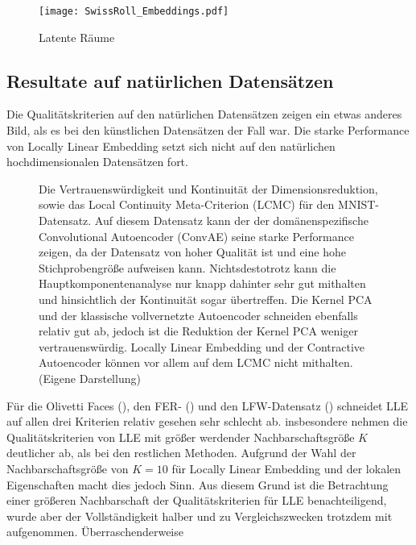 \begin{figure}[ht]
	\centering
	\texttt{[image: SwissRoll\_Embeddings.pdf]}
	\caption{Latente Räume}
\end{figure}

\subsection{Resultate auf natürlichen Datensätzen}
\label{ch:Vergleich:sec:Resultate:natuerlich}

Die Qualitätskriterien auf den natürlichen Datensätzen zeigen ein etwas anderes Bild, als es bei
den künstlichen Datensätzen der Fall war. Die starke Performance von Locally Linear Embedding setzt
sich nicht auf den natürlichen hochdimensionalen Datensätzen fort.
\begin{figure}[ht]
	\begin{center}
		
	\end{center}
	\caption[Qualitätskriterien für MNIST]{Die Vertrauenswürdigkeit und Kontinuität der Dimensionsreduktion, sowie das Local Continuity Meta-Criterion (LCMC) für den MNIST-Datensatz. Auf diesem Datensatz kann der der domänenspezifische Convolutional Autoencoder (ConvAE) seine starke Performance zeigen, da der Datensatz von hoher Qualität ist und eine hohe Stichprobengröße aufweisen kann. Nichtsdestotrotz kann die Hauptkomponentenanalyse nur knapp dahinter sehr gut mithalten und hinsichtlich der Kontinuität sogar übertreffen. Die Kernel PCA und der klassische vollvernetzte Autoencoder schneiden ebenfalls relativ gut ab, jedoch ist die Reduktion der Kernel PCA weniger vertrauenswürdig. Locally Linear Embedding und der Contractive Autoencoder können vor allem auf dem LCMC nicht mithalten. (Eigene Darstellung)}
	\label{fig:MNISTMetrics}
\end{figure}
Für die Olivetti Faces (), den FER- () und den LFW-Datensatz ()
schneidet LLE auf allen drei Kriterien relativ gesehen sehr schlecht ab. insbesondere nehmen die
Qualitätskriterien von LLE mit größer werdender Nachbarschaftsgröße $K$ deutlicher ab, als bei den
restlichen Methoden. Aufgrund der Wahl der Nachbarschaftsgröße von $K=10$ für Locally Linear
Embedding und der lokalen Eigenschaften macht dies jedoch Sinn. Aus diesem Grund ist die
Betrachtung einer größeren Nachbarschaft der Qualitätskriterien für LLE benachteiligend, wurde aber
der Vollständigkeit halber und zu Vergleichszwecken trotzdem mit aufgenommen. Überraschenderweise
